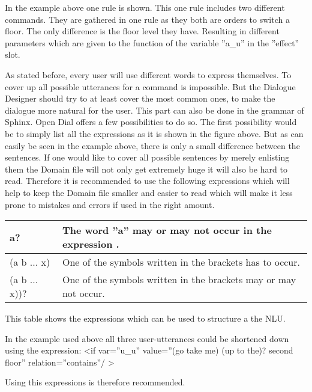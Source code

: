 In the example above one rule is shown.
This one rule includes two different commands.
They are gathered in one rule as they both are orders to switch a floor.
The only difference is the floor level they have.
Resulting in different parameters which are given to the function of the variable ”a\_u” in the ”effect” slot. \newline



As stated before, every user will use different words to express themselves.
To cover up all possible utterances for a command is impossible.
But the Dialogue Designer should try to at least cover the most common ones,  to make the dialogue more natural for the user.
This part can also be done in the grammar of Sphinx.
Open Dial offers a few possibilities to do so.
The first possibility would be to simply list all the expressions as it is shown in the figure above.
But as can easily be seen in the example above, there is only a small difference between the sentences.
If one would like to cover all possible sentences by merely enlisting them the Domain file will not only get extremely huge it will also be hard to read.
Therefore it is recommended to use the following expressions which will help to keep the Domain file smaller and easier to read which will make it less prone to mistakes and errors if used in the right amount. \newline


\begin{tabular}{|ll|}
\hline
	a? & The word ”a” may or may not occur in the expression .  \\
\hline
	(a \textbar b \textbar... \textbar x) & One of the symbols written	in the brackets has to occur.\\
\hline
	(a \textbar b \textbar... \textbar x))? & One of the symbols written in the brackets may or may not occur.  \\
\hline
\end{tabular}
\newline

This table shows the expressions which can be used to structure a the NLU. \newline \newline

In the example used above all three user-utterances could be shortened down using the expression:
\textless if var=”u\_u” value=”(go \textbar take me) (up to the)?  second floor” relation=”contains”/ \textgreater

Using this expressions is therefore recommended.


